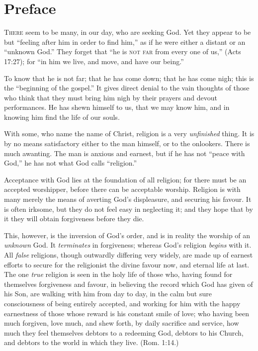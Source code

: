 \documentclass[
]{book}
\begin{document}
\hypertarget{preface}{%
\chapter*{Preface}\label{preface}}

\textsc{There} seem to be many, in our day, who are seeking God. Yet they appear to be but ``feeling after him in order to find him,'' as if he were either a distant or an ``unknown God.'' They forget that ``he is \textsc{not far} from every one of us,'' (Acts 17:27); for ``in him we live, and move, and have our being.''

To know that he is not far; that he has come down; that he has come nigh; this is the ``beginning of the gospel.'' It gives direct denial to the vain thoughts of those who think that they must bring him nigh by their prayers and devout performances. He has shewn himself to us, that we may know him, and in knowing him find the life of our souls.

With some, who name the name of Christ, religion is a very \emph{unfinished} thing. It is by no means satisfactory either to the man himself, or to the onlookers. There is much awanting. The man is anxious and earnest, but if he has not ``peace with God,'' he has not what God calls ``religion.''

Acceptance with God lies at the foundation of all religion; for there must be an accepted worshipper, before there can be acceptable worship. Religion is with many merely the means of averting God's displeasure, and securing his favour. It is often irksome, but they do not feel easy in neglecting it; and they hope that by it they will obtain forgiveness before they die.

This, however, is the inversion of God's order, and is in reality the worship of an \emph{unknown} God. It \emph{terminates} in forgiveness; whereas God's religion \emph{begins} with it. All \emph{false} religions, though outwardly differing very widely, are made up of earnest efforts to secure for the religionist the divine favour now, and eternal life at last. The one \emph{true} religion is seen in the holy life of those who, having found for themselves forgiveness and favour, in believing the record which God has given of his Son, are walking with him from day to day, in the calm but sure consciousness of being entirely accepted, and working for him with the happy earnestness of those whose reward is his constant smile of love; who having been much forgiven, love much, and shew forth, by daily sacrifice and service, how much they feel themselves debtors to a redeeming God, debtors to his Church, and debtors to the world in which they live. (Rom. 1:14.)
\end{document}

